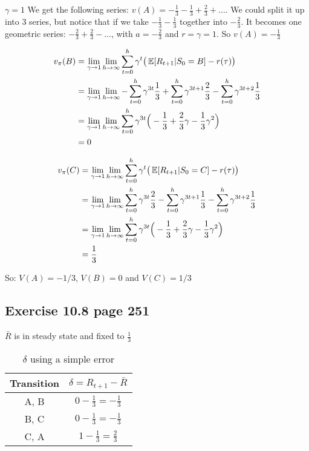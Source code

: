 $\gamma=1$ We get the following series: $v(A) = -\frac{1}{3} - \frac{1}{3} + \frac{2}{3} + ...$. We could split it up into 3 series, but notice that if we take $-\frac{1}{3} - \frac{1}{3}$ together into $-\frac{2}{3}$. It becomes one geometric series: $-\frac{2}{3} + \frac{2}{3} - ...$, with $a=-\frac{2}{3}$ and $r=\gamma=1$. So $v(A)=-\frac{1}{3}$


\begin{equation}
\begin{split}
v_{\pi}(B) & = \lim_{\gamma \rightarrow 1} \lim_{h \rightarrow \infty} \sum_{t=0}^h \gamma^t \big( \operatorname{\mathbb{E}}[R_{t+1} | S_0=B] - r(\tau) \big)\\
& = \lim_{\gamma \rightarrow 1} \lim_{h \rightarrow \infty} -\sum_{t=0}^h \gamma^{3t} \frac{1}{3} + \sum_{t=0}^h \gamma^{3t+1} \frac{2}{3} -\sum_{t=0}^h \gamma^{3t+2} \frac{1}{3} \\
& = \lim_{\gamma \rightarrow 1} \lim_{h \rightarrow \infty}  \sum_{t=0}^h \gamma^{3t} \Big( -\frac{1}{3} + \frac{2}{3}\gamma - \frac{1}{3}\gamma^2 \Big)\\
& =  0
\end{split}
\end{equation}

\begin{equation}
\begin{split}
v_{\pi}(C) & = \lim_{\gamma \rightarrow 1} \lim_{h \rightarrow \infty} \sum_{t=0}^h \gamma^t \big( \operatorname{\mathbb{E}}[R_{t+1} | S_0=C] - r(\tau) \big)\\
& = \lim_{\gamma \rightarrow 1} \lim_{h \rightarrow \infty}\sum_{t=0}^h \gamma^{3t} \frac{2}{3} - \sum_{t=0}^h \gamma^{3t+1} \frac{1}{3} -\sum_{t=0}^h \gamma^{3t+2} \frac{1}{3} \\
& = \lim_{\gamma \rightarrow 1} \lim_{h \rightarrow \infty}  \sum_{t=0}^h \gamma^{3t} \Big( -\frac{1}{3} + \frac{2}{3}\gamma - \frac{1}{3}\gamma^2 \Big)\\
& = \frac{1}{3}
\end{split}
\end{equation}

So: $V(A) = -1/3$, $V(B)=0$ and $V(C)=1/3$

\subsection{Exercise 10.8 page 251}

$\bar{R}$ is in steady state and fixed to $\frac{1}{3}$

\begin{table}
\begin{center}
	\begin{tabular}{c | c}
		Transition & $\delta=R_{t+1} - \bar{R}$ \\
		\hline
		A, B & $0 -\frac{1}{3}=-\frac{1}{3}$ \\
		B, C & $0 -\frac{1}{3}=-\frac{1}{3}$ \\
		C, A & $1 -\frac{1}{3}= \frac{2}{3}$ \\
	\end{tabular}	
\end{center}
\caption{$\delta$ using a simple error}
\end{table}

